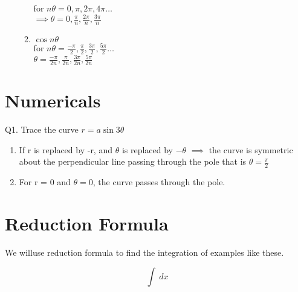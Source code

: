 \documentclass[12pt]{article}
\begin{document}
\begin{enumerate}
\begin{enumerate}
        for $n\theta = 0, \pi, 2\pi, 4\pi \dots$\\
        $\implies \theta = 0, \frac{\pi}{n}, \frac{2\pi}{n}, \frac{3\pi}{n} $
        \item $\cos n \theta $\\ 
        
        for $n\theta = \frac{-\pi}{2}, \frac{\pi}{2}, \frac{3\pi}{2}, \frac{5\pi}{2}\dots $\\
        $ \theta = \frac{-\pi}{2n}, \frac{\pi}{2n}, \frac{3\pi}{2n}, \frac{5\pi}{2n}$
    \end{enumerate}
\end{enumerate}


\section{Numericals}

Q1. Trace the curve $r = a\sin 3\theta$
\begin{enumerate}
    \item If r is replaced by -r, and $\theta$ is replaced by $-\theta$
    $\implies$ the curve is symmetric about the perpendicular line passing through the pole that is 
    $\theta = \frac{\pi}{2} $
    \item For r = 0 and $\theta = 0$, the curve passes through the pole.  
\end{enumerate}

\section{Reduction Formula}

We willuse reduction formula to find the integration of examples like these. 

\[ \int_{}^{} \,dx \]
\end{document}
